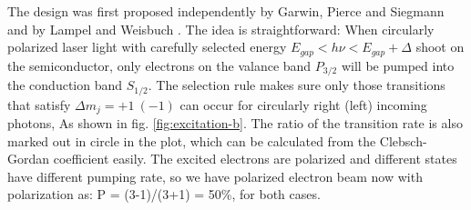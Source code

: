The design was first proposed independently by Garwin, Pierce and Siegmann \cite{GARWIN}
and by Lampel and Weisbuch \cite{LAMPEL1975877}. The idea is straightforward:
When circularly polarized laser light with carefully selected energy $E_{gap} < h\nu < E_{gap} + \Delta$
shoot on the semiconductor, only electrons on the valance band $P_{3/2}$ will be
pumped into the conduction band $S_{1/2}$. The selection rule makes sure only
those transitions that satisfy $\Delta m_j = +1 \ (-1)$ can occur for circularly
right (left) incoming photons, As shown in fig. \ref{fig:excitation-b}.
The ratio of the transition rate is also marked out in circle in the plot, 
which can be calculated from the Clebsch-Gordan coefficient easily. The excited
electrons are polarized and different states have different pumping rate, so
we have polarized electron beam now with polarization as: P = (3-1)/(3+1) = 50\%,
for both cases.

